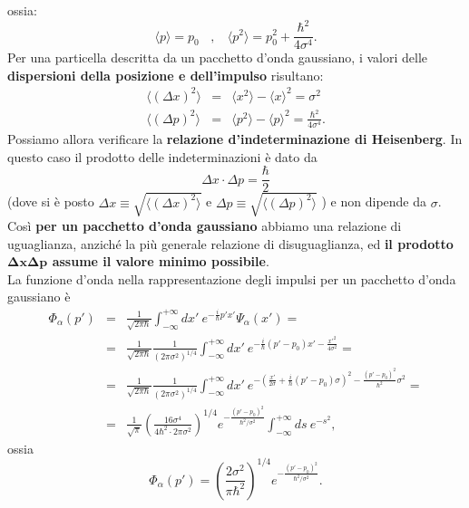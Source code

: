 \documentclass[a4paper,12pt,oneside]{book}
\begin{document}
ossia:
\begin{equation}
\langle p \rangle = p_0~~~~, ~~~~\langle p^2 \rangle = p_0^2 + \frac{\hbar^2}{4 \sigma^4}.
\end{equation}
Per una particella descritta da un pacchetto d'onda gaussiano, i valori delle \textbf{dispersioni della posizione e dell'impulso} risultano:
\begin{eqnarray}
\langle (\Delta x)^2 \rangle &=& \langle x^2 \rangle - \langle x \rangle^2 = \sigma^2\\
\langle (\Delta p)^2 \rangle &=& \langle p^2 \rangle - \langle p \rangle^2 =  \frac{\hbar^2}{4 \sigma^4}.
\end{eqnarray}
Possiamo allora verificare la \textbf{relazione d'indeterminazione di Heisenberg}. In questo caso il prodotto delle indeterminazioni è dato da
\begin{equation}
\Delta x \cdot \Delta p = \frac{\hbar}{2}
\end{equation}
(dove si è posto $\Delta x \equiv \sqrt{\langle (\Delta x)^2 \rangle}$ e $\Delta p \equiv \sqrt{\langle (\Delta p)^2 \rangle}$ ) e non dipende da $\sigma$. Così \textbf{per un pacchetto d'onda gaussiano} abbiamo una relazione di uguaglianza, anziché la più generale relazione di disuguaglianza, ed \textbf{il prodotto $\mathbf{\Delta x \Delta p}$ assume il valore minimo possibile}.\\
La funzione d'onda nella rappresentazione degli impulsi per un pacchetto d'onda gaussiano è
\begin{eqnarray}
\Phi_\alpha(p') &=& \frac{1}{\sqrt{2 \pi \hbar}} \int_{-\infty}^{+\infty} dx'~ e^{-\frac{i}{\hbar} p' x'} \Psi_\alpha(x') = \\
&=& \frac{1}{\sqrt{2 \pi \hbar}} \frac{1}{(2 \pi \sigma^2)^{1/4}} \int_{-\infty}^{+\infty} dx'~ e^{-\frac{i}{\hbar} (p'-p_0) x' - \frac{x'^2}{4 \sigma^2}} = \nonumber \\
&=& \frac{1}{\sqrt{2 \pi \hbar}} \frac{1}{(2 \pi \sigma^2)^{1/4}} \int_{-\infty}^{+\infty} dx'~ e^{-\left(\frac{x'}{2 \sigma} + \frac{i}{\hbar} (p'-p_0) \sigma \right)^2 - \frac{(p'-p_0)^2}{\hbar^2}\sigma^2} = \nonumber \\
&=&  \frac{1}{\sqrt{\pi}} \left(\frac{16 \sigma^4}{4 \hbar^2 \cdot 2 \pi \sigma^2} \right)^{1/4} e^{-\frac{(p'-p_0)^2}{\hbar^2/\sigma^2}} \int_{-\infty}^{+\infty} ds ~e^{-s^2},
\end{eqnarray}
ossia
\begin{equation}
\Phi_\alpha(p') = \left(\frac{2 \sigma^2}{\pi \hbar^2} \right)^{1/4} e^{-\frac{(p'-p_0)^2}{\hbar^2/\sigma^2}}.
\end{equation}
\end{document}
